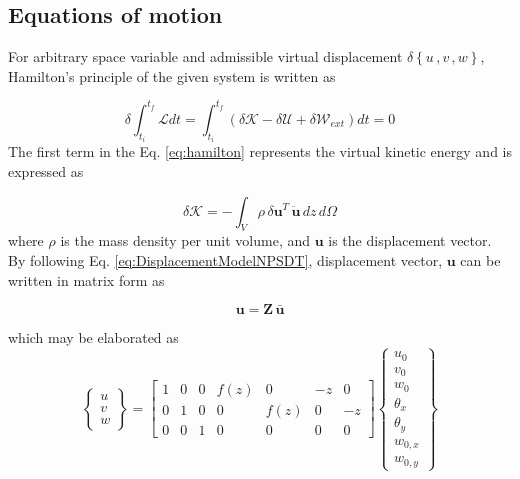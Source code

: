 \documentclass[3p,preprint,12pt]{elsarticle}
\begin{document}
\subsection{Equations of motion}
For arbitrary space variable and admissible virtual displacement $\delta\left\{ u\,,v\,,w \right\}$, Hamilton's principle of the given system is written as 

\begin{equation}
\delta\int_{t_{i}}^{t_{f}}\mathcal{L}dt=\int_{t_{i}}^{t_{f}}\left(\delta \mathcal{K}-\delta \mathcal{U}+\delta \mathcal{W}_{ext}\right)dt=0
\label{eq:hamilton}
\end{equation}%
The first term in the Eq. \cref{eq:hamilton} represents the virtual kinetic energy and is expressed as

\begin{equation} \label{eq:KineticEnergy}
\delta \mathcal{K} = -\int_{V} \rho \, \delta \boldsymbol{u}^{T} \, \ddot{\boldsymbol{u}} \, dz \, d\Omega
\end{equation}
where $\rho$ is the mass density per unit volume, and $\boldsymbol{u}$ is the displacement vector.
By following Eq. \cref{eq:DisplacementModelNPSDT}, displacement vector, $\boldsymbol{u}$ can be written in matrix form as

\begin{equation} \label{eq:displacementInMatrix}
\boldsymbol{u}  = \boldsymbol{Z} \, \boldsymbol{\bar{u}} 
\end{equation}

which may be elaborated as
\begin{equation*}
\left\{ \begin{array}{c}
u\\
v\\
w
\end{array}\right\} =\left[\begin{array}{ccccccc}
1 & 0 & 0 & f\left(z\right) & 0 & -z & 0\\
0 & 1 & 0 & 0 & f\left(z\right) & 0 & -z\\
0 & 0 & 1 & 0 & 0 & 0 & 0
\end{array}\right]\left\{ \begin{array}{c}
u_{0}\\
v_{0}\\
w_{0}\\
\theta_{x}\\
\theta_{y}\\
w_{0,x}\\
w_{0,y}
\end{array}\right\} 
\end{equation*}
\end{document}
